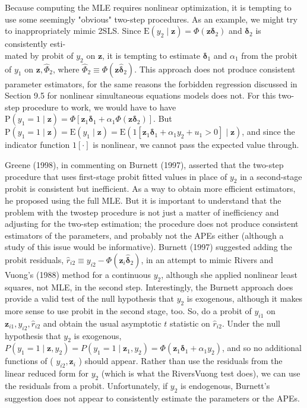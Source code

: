 \documentclass[10pt]{article}
\begin{document}
Because computing the MLE requires nonlinear optimization, it is tempting to use some seemingly "obvious" two-step procedures. As an example, we might try to inappropriately mimic 2SLS. Since $\mathrm{E}\left(y_{2} \mid \mathbf{z}\right)=\Phi\left(\mathbf{z} \boldsymbol{\delta}_{2}\right)$ and $\boldsymbol{\delta}_{2}$ is consistently esti-\\
mated by probit of $y_{2}$ on $\mathbf{z}$, it is tempting to estimate $\boldsymbol{\delta}_{1}$ and $\alpha_{1}$ from the probit of $y_{1}$ on $\mathbf{z}, \hat{\Phi}_{2}$, where $\hat{\Phi}_{2} \equiv \Phi\left(\mathbf{z} \hat{\boldsymbol{\delta}}_{2}\right)$. This approach does not produce consistent parameter estimators, for the same reasons the forbidden regression discussed in Section 9.5 for nonlinear simultaneous equations models does not. For this two-step procedure to work, we would have to have $\mathrm{P}\left(y_{1}=1 \mid \mathbf{z}\right)=\Phi\left[\mathbf{z}_{1} \boldsymbol{\delta}_{1}+\alpha_{1} \Phi\left(\mathbf{z} \boldsymbol{\delta}_{2}\right)\right]$. But $\mathrm{P}\left(y_{1}=1 \mid \mathbf{z}\right)= \mathrm{E}\left(y_{1} \mid \mathbf{z}\right)=\mathrm{E}\left(1\left[\mathbf{z}_{1} \boldsymbol{\delta}_{1}+\alpha_{1} y_{2}+u_{1}>0\right] \mid \mathbf{z}\right)$, and since the indicator function $1[\cdot]$ is nonlinear, we cannot pass the expected value through.

Greene (1998), in commenting on Burnett (1997), asserted that the two-step procedure that uses first-stage probit fitted values in place of $y_{2}$ in a second-stage probit is consistent but inefficient. As a way to obtain more efficient estimators, he proposed using the full MLE. But it is important to understand that the problem with the twostep procedure is not just a matter of inefficiency and adjusting for the two-step estimation; the procedure does not produce consistent estimators of the parameters, and probably not the APEs either (although a study of this issue would be informative). Burnett (1997) suggested adding the probit residuals, $\hat{r}_{i 2} \equiv y_{i 2}-\Phi\left(\mathbf{z}_{i} \hat{\boldsymbol{\delta}}_{2}\right)$, in an attempt to mimic Rivers and Vuong's (1988) method for a continuous $y_{2}$, although she applied nonlinear least squares, not MLE, in the second step. Interestingly, the Burnett approach does provide a valid test of the null hypothesis that $y_{2}$ is exogenous, although it makes more sense to use probit in the second stage, too. So, do a probit of $y_{i 1}$ on $\mathbf{z}_{i 1}, y_{i 2}, \hat{r}_{i 2}$ and obtain the usual asymptotic $t$ statistic on $\hat{r}_{i 2}$. Under the null hypothesis that $y_{2}$ is exogenous, $P\left(y_{1}=1 \mid \mathbf{z}, y_{2}\right)=P\left(y_{1}=1 \mid \mathbf{z}_{1}, y_{2}\right)= \Phi\left(\mathbf{z}_{1} \boldsymbol{\delta}_{1}+\alpha_{1} y_{2}\right)$, and so no additional functions of ( $y_{i 2}, \mathbf{z}_{i}$ ) should appear. Rather than use the residuals from the linear reduced form for $y_{2}$ (which is what the RiversVuong test does), we can use the residuals from a probit. Unfortunately, if $y_{2}$ is endogenous, Burnett's suggestion does not appear to consistently estimate the parameters or the APEs.
\end{document}
